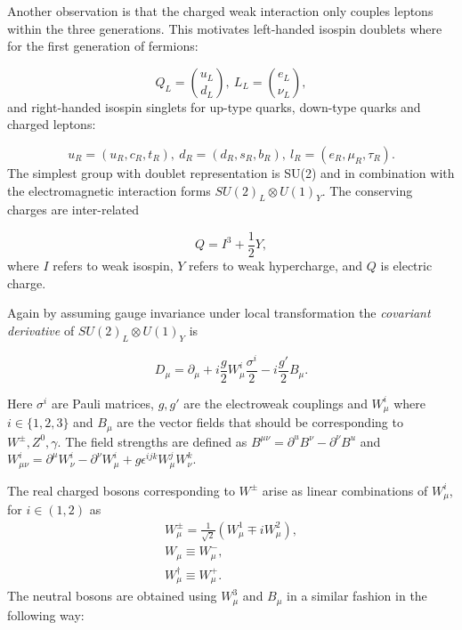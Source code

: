 Another observation is that the charged weak interaction only couples leptons within the three generations. This motivates left-handed isospin doublets where for the first generation of fermions:

\begin{equation}
Q_{L} = \binom{u_{L}}{d_{L}}, ~L_{L} = \binom{e_{L}}{\nu_{L}},
	\label{eq:defdou}
\end{equation}
and right-handed isospin singlets for up-type quarks, down-type quarks and charged leptons:

\begin{equation}
	u_{R}=(u_{R},c_{R},t_{R}),~
	d_{R}=(d_{R},s_{R},b_{R}),~
	l_{R}=(e_{R},\mu_{R},\tau_{R}).
	\label{eq:defsin}
\end{equation}
The simplest group with doublet representation is SU(2) and in combination with the electromagnetic interaction forms $SU(2)_{L} \otimes U(1)_{Y}$. The conserving charges are inter-related 

\begin{equation}
Q=I^{3} + \frac{1}{2}Y,
\end{equation}
where $I$ refers to weak isospin, $Y$ refers to weak hypercharge, and $Q$ is electric charge.

Again by assuming gauge invariance under local transformation the \textit{covariant derivative} of $SU(2)_{L}\otimes U(1)_{Y}$ is 

\begin{equation}
	D_{\mu} = \partial_{\mu} + i\frac{g}{2}W_{\mu}^{i} \frac{\sigma^{i}}{2} - i \frac{g'}{2}B_{\mu}. 
\label{eq:covdev}
\end{equation}

Here $\sigma^{i}$ are Pauli matrices, $g,g'$ are the electroweak couplings and $W_{\mu}^{i}$ where $i\in\{1,2,3\}$ and $B_{\mu}$ are the vector fields that should be corresponding to $W^{\pm},Z^{0},\gamma$.
The field strengths are defined as $B^{\mu\nu}=\partial^{u}B^{\nu} - \partial^{\nu}B^{u}$ and $W^{i}_{\mu\nu} = \partial^{\mu}W^{i}_{\nu} - \partial^{\nu}W^{i}_{\mu}+ g\epsilon^{ijk}W_{\mu}^{j}W_{\nu}^{k}$.

The real charged bosons corresponding to $W^{\pm}$ arise as linear combinations of $W^{i}_{\mu}$, for $i\in(1,2)$ as
\begin{equation}
\begin{split}
W^{\pm}_{\mu} = \frac{1}{\sqrt{2}}(W^{1}_{\mu}\mp iW^{2}_{\mu}),
\\
W_{\mu} \equiv W^{-}_{\mu},
\\
W^{\dagger}_{\mu} \equiv W^{+}_{\mu}. 
\end{split}
\end{equation} 
The neutral bosons are obtained using $W_{\mu}^{3}$ and $B_{\mu}$ in a similar fashion in the following way:


